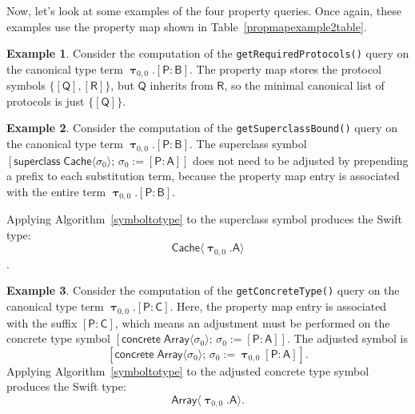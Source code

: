 \documentclass[a4paper,headsepline,bibliography=totoc,toc=flat,fleqn,twoside=semi]{scrbook}
\theoremstyle{definition}
\theoremstyle{definition}
\newtheorem{example}{Example}[chapter]
\theoremstyle{definition}
\newcommand{\namesym}[1]{\mathsf{#1}}
\newcommand{\proto}[1]{\bm{\mathsf{#1}}}
\newcommand{\protosym}[1]{[\proto{#1}]}
\newcommand{\genericsym}[2]{\bm{\uptau}_{#1,#2}}
\newcommand{\assocsym}[2]{[\proto{#1}\colon\namesym{#2}]}
\newcommand{\supersym}[1]{[\mathsf{superclass}\;#1]}
\newcommand{\concretesym}[1]{[\mathsf{concrete}\;#1]}
\begin{document}
Now, let's look at some examples of the four property queries. Once again, these examples use the property map shown in Table~\ref{propmapexample2table}.
\begin{example}
Consider the computation of the \texttt{getRequiredProtocols()} query on the canonical type term $\genericsym{0}{0}.\assocsym{P}{B}$. The property map stores the protocol symbols $\{\protosym{Q},\protosym{R}\}$, but $\proto{Q}$ inherits from $\proto{R}$, so the minimal canonical list of protocols is just $\{\protosym{Q}\}$.
\end{example}
\begin{example}
Consider the computation of the \texttt{getSuperclassBound()} query on the canonical type term $\genericsym{0}{0}.\assocsym{P}{B}$.
The superclass symbol $\supersym{\namesym{Cache}\langle\sigma_0\rangle;\,\sigma_0:=\assocsym{P}{A}}$ does not need to be adjusted by prepending a prefix to each substitution term, because the property map entry is associated with the entire term $\genericsym{0}{0}.\assocsym{P}{B}$.

Applying Algorithm~\ref{symboltotype} to the superclass symbol produces the Swift type:
\[\namesym{Cache}\langle\genericsym{0}{0}.\namesym{A}\rangle\].
\end{example}
\begin{example}
Consider the computation of the \texttt{getConcreteType()} query on the canonical type term $\genericsym{0}{0}.\assocsym{P}{C}$. Here, the property map entry is associated with the suffix $\assocsym{P}{C}$, which means an adjustment must be performed on the concrete type symbol 
$\concretesym{\namesym{Array}\langle\sigma_0\rangle;\,\sigma_0:=\assocsym{P}{A}}$. The adjusted symbol is
\[\concretesym{\namesym{Array}\langle\sigma_0\rangle;\,\sigma_0:=\genericsym{0}{0}\assocsym{P}{A}}.\]
Applying Algorithm~\ref{symboltotype} to the adjusted concrete type symbol produces the Swift type:
\[\namesym{Array}\langle\genericsym{0}{0}.\namesym{A}\rangle.\]
\end{example}
\end{document}
